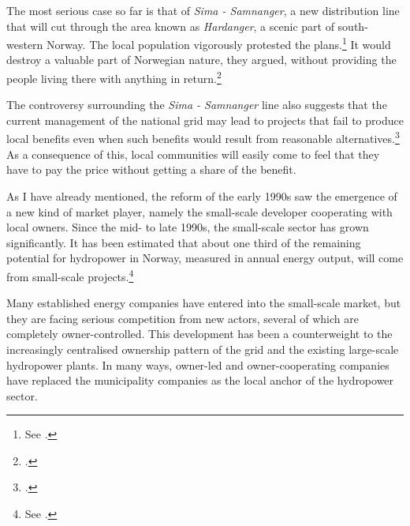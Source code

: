 The most serious case so far is that of {\it Sima - Samnanger}, a new distribution line that will cut through the area known as {\it Hardanger}, a scenic part of south-western Norway. The local population vigorously protested the plans.\footnote{See \cite[22-23]{brekke12}.} It would destroy a valuable part of Norwegian nature, they argued, without providing the people living there with anything in return.\footcite[26-27]{brekke12} %

The controversy surrounding the {\it Sima - Samnanger} line also suggests that the current management of the national grid may lead to projects that fail to produce local benefits even when such benefits would result from reasonable alternatives.\footcite[27]{brekke12} As a consequence of this, local communities will easily come to feel that they have to pay the price without getting a share of the benefit.

As I have already mentioned, the reform of the early 1990s saw the emergence of a new kind of market player, namely the small-scale developer cooperating with local owners. Since the mid- to late 1990s, the small-scale sector has grown significantly. It has been estimated that about one third of the remaining potential for hydropower in Norway, measured in annual energy output, will come from small-scale projects.\footnote{See \cite[231]{nou129}.}

Many established energy companies have entered into the small-scale market, but they are facing serious competition from new actors, several of which are completely owner-controlled. This development has been a counterweight to the increasingly centralised ownership pattern of the grid and the existing large-scale hydropower plants. In many ways, owner-led and owner-cooperating companies have replaced the municipality companies as the local anchor of the hydropower sector. 

